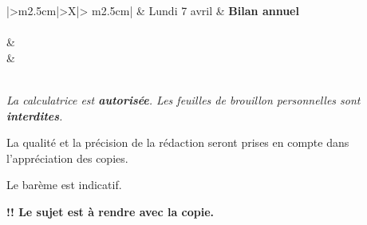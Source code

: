 \documentclass[12pt,french]{article}
\begin{document}
\begin{center}
\begin{tabularx}{\textwidth}{|>\centering m{2.5cm}|>\centering X|>{\centering\arraybackslash} m{2.5cm}|}
	\iere {} &  Lundi 7 avril  & \textbf{Bilan annuel} \\
	\hline
		 \\
	\hline
         &  \\
		 &  \\
	\hline
         \\[1cm]
    \hline
\end{tabularx}\bigskip

{\itshape
La calculatrice est \textbf{autorisée}. Les feuilles de brouillon personnelles sont \textbf{interdites}.\par
La qualité et la précision de la rédaction seront prises en compte dans l'appréciation des copies.\par
Le barème est indicatif.\par\medskip
\textbf{ !! Le sujet est à rendre avec la copie.}
}
\end{center}

\end{document}
